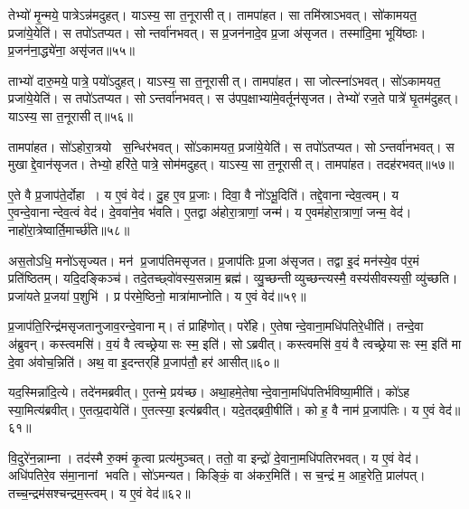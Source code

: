 तेभ्यो॑ मृ॒न्मये॒ पात्रेऽन्न॑मदुहत्। याऽस्य॒ सा त॒नूरासीत्। तामपा॑हत। सा तमि॑स्राऽभवत्। सो॑कामयत॒ प्रजा॑ये॒येति॑। स तपो॑ऽतप्यत। सोन्तर्वा॑नभवत्। स प्र॒जन॑नादे॒व प्र॒जा अ॑सृजत। तस्मा॑दि॒मा भूयि॑ष्ठाः। प्र॒जन॑ना॒द्ध्ये॑ना॒ असृ॑जत॥५५॥

ताभ्यो॑ दारु॒मये॒ पात्रे॒ पयो॑ऽदुहत्। याऽस्य॒ सा त॒नूरासीत्। तामपा॑हत। सा जोत्स्ना॑ऽभवत्। सो॑ऽकामयत॒ प्रजा॑ये॒येति॑। स तपो॑ऽतप्यत। सोऽन्तर्वा॑नभवत्। स उ॑पप॒क्षाभ्या॑मे॒वर्तून॑सृजत। तेभ्यो॑ रज॒ते पात्रे॑ घृ॒तम॑दुहत्। याऽस्य॒ सा त॒नूरासीत्॥५६॥

तामपा॑हत। सो॑ऽहोरा॒त्रयो स॒न्धिर॑भवत्। सो॑ऽकामयत॒ प्रजा॑ये॒येति॑। स तपो॑ऽतप्यत। सोऽन्तर्वा॑नभवत्। स मुखाद्दे॒वान॑सृजत। तेभ्यो॒ हरि॑ते॒ पात्रे॒ सोम॑मदुहत्। याऽस्य॒ सा त॒नूरासीत्। तामपा॑हत। तदह॑रभवत्॥५७॥

ए॒ते वै प्र॒जाप॑ते॒र्दोहा। य ए॒वं वेद॑। दु॒ह ए॒व प्र॒जाः। दिवा॒ वै नो॑ऽभू॒दिति॑। तद्दे॒वानान्देव॒त्वम्। य ए॒वन्दे॒वानान्देव॒त्वं वेद॑। दे॒ववा॑ने॒व भ॑वति। ए॒तद्वा अ॑होरा॒त्राणां॒ जन्म॑। य ए॒वम॑होरा॒त्राणां॒ जन्म॒ वेद॑। नाहो॑रा॒त्रेष्वार्ति॒मार्च्छ॑ति॥५८॥

अस॒तोऽधि॒ मनो॑ऽसृज्यत। मन॑ प्र॒जाप॑तिमसृजत। प्र॒जाप॑तिः प्र॒जा अ॑सृजत। तद्वा इ॒दं मन॑स्ये॒व प॑र॒मं प्रति॑ष्ठितम्। यदि॒दङ्किञ्च॑। तदे॒तच्छ्वो॑वस्य॒सन्नाम॒ ब्रह्म॑। व्यु॒च्छन्तीव्युच्छन्त्यस्मै॒ वस्य॑सीवस्यसी॒ व्यु॑च्छति। प्रजा॑यते प्र॒जया॑ प॒शुभि॑। प्र प॑रमे॒ष्ठिनो॒ मात्रा॑माप्नोति। य ए॒वं वेद॑॥५९॥

प्र॒जाप॑ति॒रिन्द्र॑मसृजतानुजाव॒रन्दे॒वानाम्। तं प्राहि॑णोत्। परे॑हि। ए॒तेषान्दे॒वाना॒मधि॑पतिरे॒धीति॑। तन्दे॒वा अ॑ब्रुवन्। कस्त्वमसि॑। व॒यं वै त्वच्छ्रेयासः स्म॒ इति॑। सोऽब्रवीत्। कस्त्वमसि॑ व॒यं वै त्वच्छ्रेयासः स्म॒ इति॑ मा दे॒वा अ॑वोच॒न्निति॑। अथ॒ वा इ॒दन्तर्‌हि॑ प्र॒जाप॑तौ॒ हर॑ आसीत्॥६०॥

यद॒स्मिन्ना॑दि॒त्ये। तदे॑नमब्रवीत्। ए॒तन्मे॒ प्रय॑च्छ। अथा॒हमे॒तेषान्दे॒वाना॒मधि॑पतिर्भविष्या॒मीति॑। को॑ऽह स्या॒मित्य॑ब्रवीत्। ए॒तत्प्र॒दायेति॑। ए॒तत्स्या॒ इत्य॑ब्रवीत्। यदे॒तद्ब्रवी॒षीति॑। को ह॒ वै नाम॑ प्र॒जाप॑तिः। य ए॒वं वेद॑॥६१॥

वि॒दुरे॑न॒न्नाम्ना। तद॑स्मै रु॒क्मं कृ॒त्वा प्रत्य॑मुञ्चत्। ततो॒ वा इन्द्रो॑ दे॒वाना॒मधि॑पतिरभवत्। य ए॒वं वेद॑। अधि॑पतिरे॒व स॑मा॒नानां भवति। सो॑ऽमन्यत। किङ्किं॒ वा अ॑कर॒मिति॑। स च॒न्द्रं म॒ आह॒रेति॒ प्राल॑पत्। तच्च॒न्द्रम॑सश्चन्द्रम॒स्त्वम्। य ए॒वं वेद॑॥६२॥

